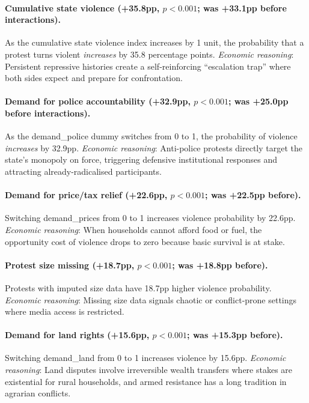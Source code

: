 \documentclass[12pt,a4paper]{article}
\begin{document}
\paragraph{Cumulative state violence (+35.8pp, $p < 0.001$; was +33.1pp before interactions).}
As the cumulative state violence index increases by 1 unit, the probability that a protest turns violent \emph{increases} by 35.8 percentage points. \emph{Economic reasoning}: Persistent repressive histories create a self-reinforcing ``escalation trap'' where both sides expect and prepare for confrontation.

\paragraph{Demand for police accountability (+32.9pp, $p < 0.001$; was +25.0pp before interactions).}
As the demand\_police dummy switches from 0 to 1, the probability of violence \emph{increases} by 32.9pp. \emph{Economic reasoning}: Anti-police protests directly target the state's monopoly on force, triggering defensive institutional responses and attracting already-radicalised participants.

\paragraph{Demand for price/tax relief (+22.6pp, $p < 0.001$; was +22.5pp before).}
Switching demand\_prices from 0 to 1 increases violence probability by 22.6pp. \emph{Economic reasoning}: When households cannot afford food or fuel, the opportunity cost of violence drops to zero because basic survival is at stake.

\paragraph{Protest size missing (+18.7pp, $p < 0.001$; was +18.8pp before).}
Protests with imputed size data have 18.7pp higher violence probability. \emph{Economic reasoning}: Missing size data signals chaotic or conflict-prone settings where media access is restricted.

\paragraph{Demand for land rights (+15.6pp, $p < 0.001$; was +15.3pp before).}
Switching demand\_land from 0 to 1 increases violence by 15.6pp. \emph{Economic reasoning}: Land disputes involve irreversible wealth transfers where stakes are existential for rural households, and armed resistance has a long tradition in agrarian conflicts.
\end{document}
